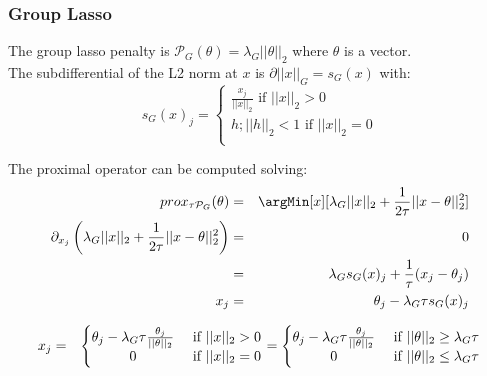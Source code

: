 \documentclass{article}
\begin{document}
\boxResult{
\[prox_{\tau \mathcal{P}_2}(\theta) = \frac{1}{1+\tau\lambda_2}\theta \]
}

\subsubsection{Group Lasso}
\label{sec:orge51319d}

The group lasso penalty is $\mathcal{P}_G(\theta)=\lambda_G||\theta||_2$ where $\theta$ is a vector. \\
The subdifferential of the L2 norm at \(x\) is \(\partial ||x||_G = s_G(x) \) with:
\[ s_G(x)_j = \left\{ \begin{array}{l} \frac{x_j}{||x||_2} \text{ if } ||x||_2 > 0 \\
                              h ; ||h||_2<1 \text{ if } ||x||_2 = 0 \\
                 \end{array} \right. \]

The proximal operator can be computed solving:
\begin{eqnarray*}
prox_{\tau \mathcal{P}_G}(\theta) &=& \argMin[x][\lambda_G||x||_2+\frac{1}{2\tau} ||x-\theta||_2^2] \\
\partial_{x_j}\left(\lambda_G||x||_2+\frac{1}{2 \tau} ||x-\theta||_2^2 \right) 
       &=& 0 \\
       &=& \lambda_G s_G(x)_j+\frac{1}{\tau} (x_j-\theta_j) \\
     x_j &=& \theta_j - \lambda_G \tau s_G(x)_j	
\end{eqnarray*}
		
\begin{eqnarray}
x_j &=& \left\{ \begin{matrix}
\theta_j - \lambda_G \tau  \frac{\theta_j}{||\theta||_2} &\text{ if } ||x||_2>0  \\
0 & \text{ if } ||x||_2=0  \\
\end{matrix}  \right. 
= \left\{ \begin{matrix}
\theta_j - \lambda_G \tau \frac{\theta_j}{||\theta||_2} &\text{ if } ||\theta||_2\geq\lambda_G\tau  \\
0 & \text{ if } ||\theta||_2\leq\lambda_G\tau  \\
\end{matrix}  \right. \notag 
\end{eqnarray}
		
\boxResult{
\[prox_{\tau \mathcal{P}_G}(\theta) =\theta\left(1-\frac{\lambda_G\tau}{||\theta||_2}\right)^+ \]
}
\end{document}
